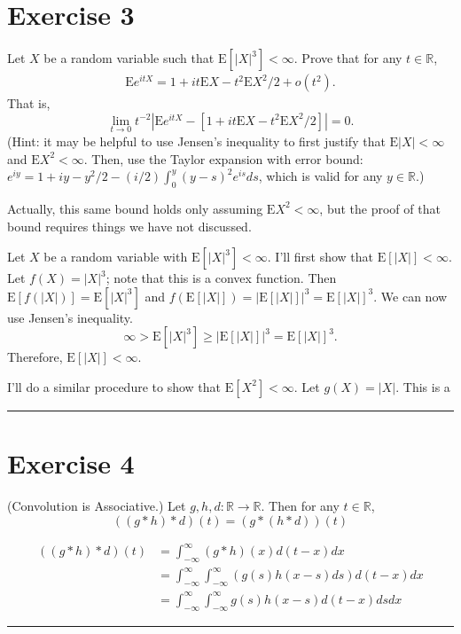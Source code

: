 \documentclass{article}
\theoremstyle{break}
\newenvironment{solution}{{\bf Solution:}}{\hfill\rule{2mm}{2mm}}
\renewenvironment{proof}{{\bf Proof:}}{\hfill\rule{2mm}{2mm}}
\newcommand{\E}{\mathrm{E}}
\newcommand{\R}{\mathbb{R}}
\begin{document}
\section*{Exercise 3}
Let $X$ be a random variable such that $\E[ |X|^{3}] <\infty$.  Prove that for any $t\in\R$,
\begin{align*}
\E e^{itX}=1+it\E X-t^{2}\E X^{2}/2+o(t^{2}).
\end{align*}
That is,
$$\lim_{t \rightarrow 0}t^{-2} |\E e^{itX}-[1+it\E X-t^{2}\E X^{2}/2]|=0.$$
(Hint: it may be helpful to use Jensen's inequality to first justify that $\E |X|<\infty$ and $\E X^{2}<\infty$.  Then, use the Taylor expansion with error bound: $e^{iy}=1+iy-y^{2}/2-(i/2)\int_{0}^{y}(y-s)^{2}e^{is}ds$, which is valid for any $y\in\R$.)

Actually, this same bound holds only assuming $\E X^{2}<\infty$, but the proof of that bound requires things we have not discussed.

\begin{solution}
Let $X$ be a random variable with $\E[|X|^3] < \infty$. I'll first show that $\E[|X|] < \infty$. Let $f(X) = |X|^3$; note that this is a convex function. 
Then $\E[f(|X|)] = \E[|X|^3]$ and $f(\E[|X|]) = |\E[|X|]|^3 = \E[|X|]^3$. We can now use Jensen's inequality. 
\[ \infty > \E[|X|^3] \geq |\E[|X|]|^3 = \E[|X|]^3.\]
Therefore, $\E[|X|] < \infty$.

I'll do a similar procedure to show that $\E[X^2] < \infty$. Let $g(X) = |X|$. This is a 



\end{solution}


\section*{Exercise 4}
(Convolution is Associative.)
Let $g,h,d\colon\R\to\R$.  Then for any $t\in\R$,
$$((g*h)*d)(t)=(g*(h*d))(t)$$


\begin{proof}

\begin{align*}
((g \ast h) \ast d)(t)&= \int_{-\infty}^\infty (g \ast h)(x) d(t-x) dx \\
	&= \int_{-\infty}^\infty \int_{-\infty}^\infty (g(s) h(x-s) ds ) d(t-x) dx \\
	&= \int_{-\infty}^\infty \int_{-\infty}^\infty g(s) h(x-s) d(t-x) ds dx
\end{align*}

\end{proof}
\end{document}
